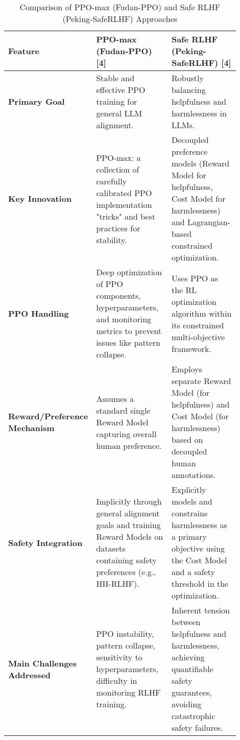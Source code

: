 \documentclass[10pt,journal,compsoc]{IEEEtran} %
\begin{document}
\begin{table*}[htbp]
  \centering
  \caption{Comparison of PPO-max (Fudan-PPO) and Safe RLHF (Peking-SafeRLHF) Approaches}
  \label{tab:comparison_fudan_peking}
  \begin{tabular}{p{0.2\linewidth} p{0.35\linewidth} p{0.35\linewidth}}
    \toprule
    \textbf{Feature} & \textbf{PPO-max (Fudan-PPO) [4]} & \textbf{Safe RLHF (Peking-SafeRLHF) [4]} \\
    \midrule
    \textbf{Primary Goal} & Stable and effective PPO training for general LLM alignment. & Robustly balancing helpfulness and harmlessness in LLMs. \\
    \textbf{Key Innovation} & PPO-max: a collection of carefully calibrated PPO implementation "tricks" and best practices for stability. & Decoupled preference models (Reward Model for helpfulness, Cost Model for harmlessness) and Lagrangian-based constrained optimization. \\
    \textbf{PPO Handling} & Deep optimization of PPO components, hyperparameters, and monitoring metrics to prevent issues like pattern collapse. & Uses PPO as the RL optimization algorithm within its constrained multi-objective framework. \\
    \textbf{Reward/Preference Mechanism} & Assumes a standard single Reward Model capturing overall human preference. & Employs separate Reward Model (for helpfulness) and Cost Model (for harmlessness) based on decoupled human annotations. \\
    \textbf{Safety Integration} & Implicitly through general alignment goals and training Reward Models on datasets containing safety preferences (e.g., HH-RLHF). & Explicitly models and constrains harmlessness as a primary objective using the Cost Model and a safety threshold in the optimization. \\
    \textbf{Main Challenges Addressed} & PPO instability, pattern collapse, sensitivity to hyperparameters, difficulty in monitoring RLHF training. & Inherent tension between helpfulness and harmlessness, achieving quantifiable safety guarantees, avoiding catastrophic safety failures. \\
    \bottomrule
  \end{tabular}
\end{table*}
\end{document}
